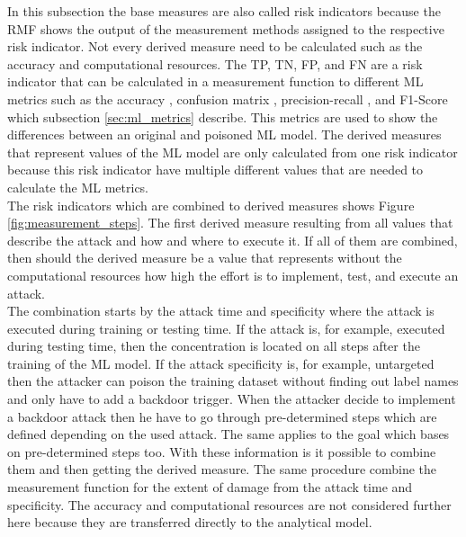 In this subsection the base measures are also called risk indicators because the RMF shows the output of the measurement methods assigned to the respective risk indicator. Not every derived measure need to be calculated such as the accuracy and computational resources. The TP, TN, FP, and FN are a risk indicator that can be calculated in a measurement function to different ML metrics such as the accuracy \cite{9783960101925}, confusion matrix \cite{DBLP:journals/isci/XuZM20}, precision-recall \cite{DBLP:conf/icml/DavisG06}, and F1-Score \cite{9783960101925} which subsection \ref{sec:ml_metrics} describe. This metrics are used to show the differences between an original and poisoned ML model. The derived measures that represent values of the ML model are only calculated from one risk indicator because this risk indicator have multiple different values that are needed to calculate the ML metrics. \\
The risk indicators which are combined to derived measures shows Figure \ref{fig:measurement_steps}. The first derived measure resulting from all values that describe the attack and how and where to execute it. If all of them are combined, then should the derived measure be a value that represents without the computational resources how high the effort is to implement, test, and execute an attack. \\
The combination starts by the attack time and specificity where the attack is executed during training or testing time. If the attack is, for example, executed during testing time, then the concentration is located on all steps after the training of the ML model. If the attack specificity is, for example, untargeted then the attacker can poison the training dataset without finding out label names and only have to add a backdoor trigger. When the attacker decide to implement a backdoor attack then he have to go through pre-determined steps which are defined depending on the used attack. The same applies to the goal which bases on pre-determined steps too. With these information is it possible to combine them and then getting the derived measure. The same procedure combine the measurement function for the extent of damage from the attack time and specificity. The accuracy and computational resources are not considered further here because they are transferred directly to the analytical model.

